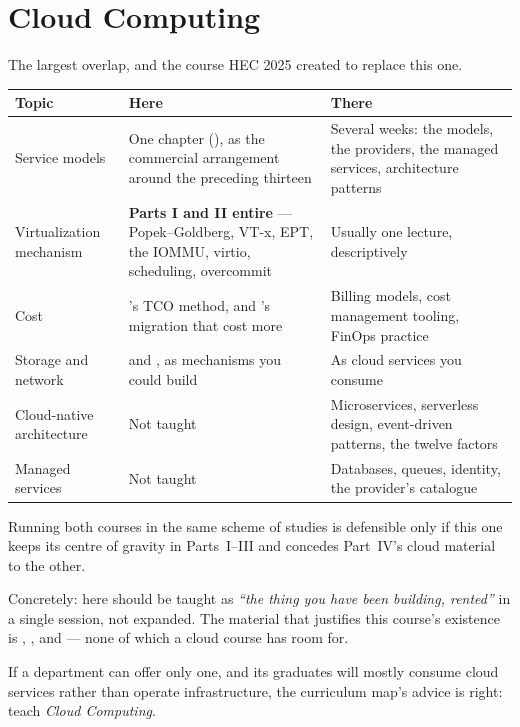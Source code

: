 \section{Cloud Computing}

The largest overlap, and the course HEC 2025 created to replace this one.

\begin{longtable}{@{}L{4.6cm}L{5.0cm}L{5.0cm}@{}}
\toprule
{}
\textbf{Topic} & \textbf{Here} & \textbf{There} \\
\midrule
\endhead
Service models & One chapter (), as the commercial arrangement
around the preceding thirteen & Several weeks: the models, the providers, the
managed services, architecture patterns \\
Virtualization mechanism & \textbf{Parts I and II entire} --- Popek--Goldberg,
VT-x, EPT, the IOMMU, virtio, scheduling, overcommit & Usually one lecture,
descriptively \\
Cost & 's TCO method, and 's migration that
cost more & Billing models, cost management tooling, FinOps practice \\
Storage and network &  and , as mechanisms you
could build & As cloud services you consume \\
Cloud-native architecture & Not taught & Microservices, serverless design,
event-driven patterns, the twelve factors \\
Managed services & Not taught & Databases, queues, identity, the provider's
catalogue \\
\bottomrule
\end{longtable}

\begin{alertbox}
Running both courses in the same scheme of studies is defensible only if this
one keeps its centre of gravity in Parts~I--III and concedes Part~IV's cloud
material to the other.

\smallskip
Concretely:  here should be taught as \emph{``the thing you have
been building, rented''} in a single session, not expanded. The material that
justifies this course's existence is , ,
 and  --- none of which a cloud course has room
for.

\smallskip
If a department can offer only one, and its graduates will mostly consume cloud
services rather than operate infrastructure, the curriculum map's advice is
right: teach \emph{Cloud Computing}.
\end{alertbox}

